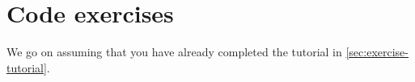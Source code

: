 

\section{Code exercises}

We go on assuming that you have already completed the tutorial in \cref{sec:exercise-tutorial}.
